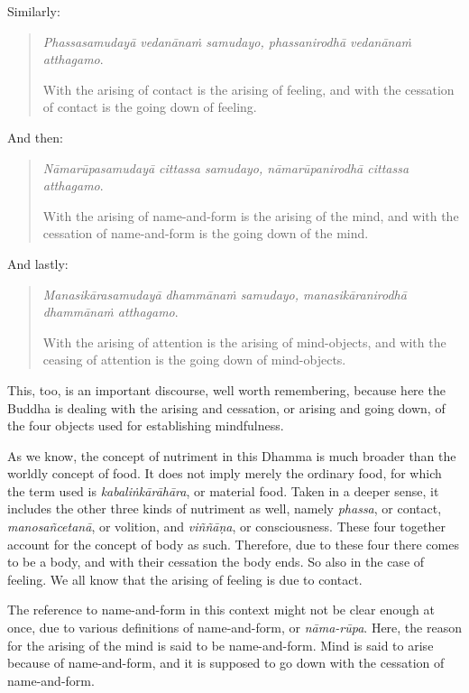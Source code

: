 Similarly:

\begin{quote}
\emph{Phassasamudayā vedanānaṁ samudayo, phassanirodhā vedanānaṁ atthagamo}.

With the arising of contact is the arising of feeling, and with the cessation of contact is the going down of feeling.
\end{quote}

And then:

\begin{quote}
\emph{Nāmarūpasamudayā cittassa samudayo, nāmarūpanirodhā cittassa atthagamo}.

With the arising of name-and-form is the arising of the mind, and with the cessation of name-and-form is the going down of the mind.
\end{quote}

And lastly:

\begin{quote}
\emph{Manasikārasamudayā dhammānaṁ samudayo, manasikāranirodhā dhammānaṁ atthagamo}.

With the arising of attention is the arising of mind-objects, and with the ceasing of attention is the going down of mind-objects.
\end{quote}

This, too, is an important discourse, well worth remembering, because here the Buddha is dealing with the arising and cessation, or arising and going down, of the four objects used for establishing mindfulness.

As we know, the concept of nutriment in this Dhamma is much broader than the worldly concept of food. It does not imply merely the ordinary food, for which the term used is \emph{kabaliṅkārāhāra}, or material food. Taken in a deeper sense, it includes the other three kinds of nutriment as well, namely \emph{phassa}, or contact, \emph{manosañcetanā}, or volition, and \emph{viññāṇa}, or consciousness. These four together account for the concept of body as such. Therefore, due to these four there comes to be a body, and with their cessation the body ends. So also in the case of feeling. We all know that the arising of feeling is due to contact.

The reference to name-and-form in this context might not be clear enough at once, due to various definitions of name-and-form, or \emph{nāma-rūpa}. Here, the reason for the arising of the mind is said to be name-and-form. Mind is said to arise because of name-and-form, and it is supposed to go down with the cessation of name-and-form.

